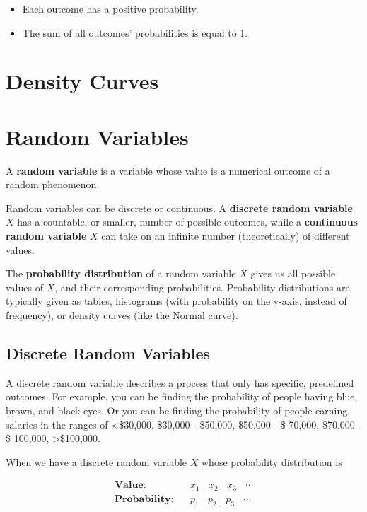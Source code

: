 \documentclass[
]{book}
\providecommand{\tightlist}{%
  \setlength{\itemsep}{0pt}\setlength{\parskip}{0pt}}
\begin{document}
\begin{itemize}
\tightlist
\item
  Each outcome has a positive probability.
\item
  The sum of all outcomes' probabilities is equal to 1.
\end{itemize}

\hypertarget{density-curves}{%
\chapter{Density Curves}\label{density-curves}}

\hypertarget{random-variables}{%
\chapter{Random Variables}\label{random-variables}}

A \textbf{random variable} is a variable whose value is a numerical outcome
of a random phenomenon.

Random variables can be discrete or continuous. A \textbf{discrete random
variable} \(X\) has a countable, or smaller, number of possible outcomes,
while a \textbf{continuous random variable} \(X\) can take on an infinite
number (theoretically) of different values.

The \textbf{probability distribution} of a random variable \(X\) gives us all
possible values of \(X\), and their corresponding probabilities.
Probability distributions are typically given as tables, histograms
(with probability on the y-axis, instead of frequency), or density
curves (like the Normal curve).

\hypertarget{discrete-random-variables}{%
\section{Discrete Random Variables}\label{discrete-random-variables}}

A discrete random variable describes a process that only has specific,
predefined outcomes. For example, you can be finding the probability of
people having blue, brown, and black eyes. Or you can be finding the
probability of people earning salaries in the ranges of \textless\$30,000,
\$30,000 - \$50,000, \$50,000 - \$ 70,000, \$70,000 - \$ 100,000,
\textgreater\$100,000.

When we have a discrete random variable \(X\) whose probability
distribution is

\[
\begin{aligned}
    \textbf{Value:}& ~~~~ x_1 ~~~~ x_2 ~~~~ x_3 ~~~~ \cdots \\
    \textbf{Probability:}& ~~~~ p_1 ~~~~ p_2 ~~~~ p_3 ~~~~\cdots
\end{aligned}
\]
\end{document}
